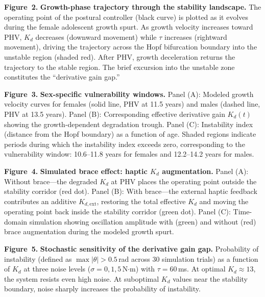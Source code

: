\documentclass[12pt,a4paper]{article}
\begin{document}
\bigskip
\noindent\textbf{Figure~2.} \textbf{Growth-phase trajectory through the stability landscape.} The operating point of the postural controller (black curve) is plotted as it evolves during the female adolescent growth spurt. As growth velocity increases toward PHV, $K_d$ decreases (downward movement) while $\tau$ increases (rightward movement), driving the trajectory across the Hopf bifurcation boundary into the unstable region (shaded red). After PHV, growth deceleration returns the trajectory to the stable region. The brief excursion into the unstable zone constitutes the ``derivative gain gap.''
\label{fig:trajectory}

\bigskip
\noindent\textbf{Figure~3.} \textbf{Sex-specific vulnerability windows.} Panel (A): Modeled growth velocity curves for females (solid line, PHV at 11.5 years) and males (dashed line, PHV at 13.5 years). Panel (B): Corresponding effective derivative gain $K_d(t)$ showing the growth-dependent degradation trough. Panel (C): Instability index (distance from the Hopf boundary) as a function of age. Shaded regions indicate periods during which the instability index exceeds zero, corresponding to the vulnerability window: 10.6--11.8 years for females and 12.2--14.2 years for males.
\label{fig:sex_specific}

\bigskip
\noindent\textbf{Figure~4.} \textbf{Simulated brace effect: haptic $K_d$ augmentation.} Panel (A): Without brace---the degraded $K_d$ at PHV places the operating point outside the stability corridor (red dot). Panel (B): With brace---the external haptic feedback contributes an additive $K_{d,\text{ext}}$, restoring the total effective $K_d$ and moving the operating point back inside the stability corridor (green dot). Panel (C): Time-domain simulation showing oscillation amplitude with (green) and without (red) brace augmentation during the modeled growth spurt.
\label{fig:brace}

\bigskip
\noindent\textbf{Figure~5.} \textbf{Stochastic sensitivity of the derivative gain gap.} Probability of instability (defined as $\max|\theta| > 0.5$\,rad across 30 simulation trials) as a function of $K_d$ at three noise levels ($\sigma = 0, 1, 5$\,N$\cdot$m) with $\tau = 60$\,ms. At optimal $K_d \approx 13$, the system resists even high noise. At suboptimal $K_d$ values near the stability boundary, noise sharply increases the probability of instability.
\label{fig:stochastic}
\end{document}
